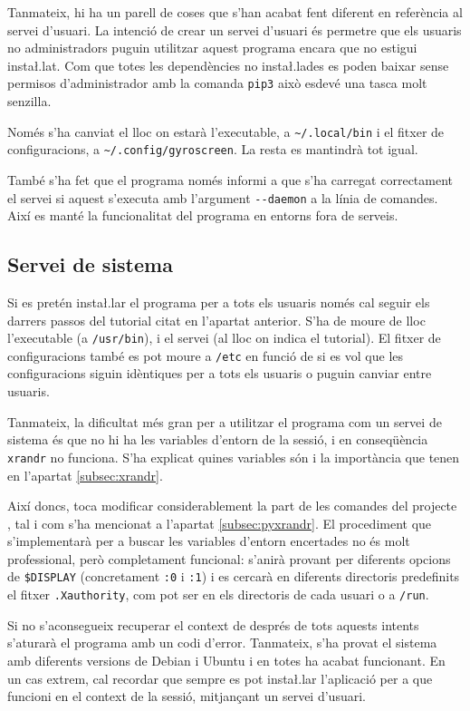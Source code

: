 Tanmateix, hi ha un parell de coses que s'han acabat fent diferent en referència
al servei d'usuari. La intenció de crear un servei d'usuari és permetre que els
usuaris no administradors puguin utilitzar aquest programa encara que no estigui
insta\l.lat. Com que totes les dependències no insta\l.lades es poden baixar
sense permisos d'administrador amb la comanda \verb|pip3| això esdevé una tasca
molt senzilla.

Només s'ha canviat el lloc on estarà l'executable, a \verb|~/.local/bin| i el
fitxer de configuracions, a \verb|~/.config/gyroscreen|. La resta es mantindrà
tot igual.

També s'ha fet que el programa només informi a  que s'ha carregat
correctament el servei si aquest s'executa amb l'argument \verb|--daemon| a la
línia de comandes. Així es manté la funcionalitat del programa en entorns fora
de serveis.

\subsection{Servei de sistema}
\label{subsec:systemd_system}

Si es pretén insta\l.lar el programa per a tots els usuaris només cal seguir
els darrers passos del tutorial citat en l'apartat anterior. S'ha de moure de
lloc l'executable (a \verb|/usr/bin|), i el servei (al lloc on indica el
tutorial). El fitxer de configuracions també es pot moure a \verb|/etc| en funció
de si es vol que les configuracions siguin idèntiques per a tots els usuaris o
puguin canviar entre usuaris.

Tanmateix, la dificultat més gran per a utilitzar el programa com un servei de
sistema és que no hi ha les variables d'entorn de la sessió, i en conseqüència
\verb|xrandr| no funciona. S'ha explicat quines variables són i la importància
que tenen en l'apartat \ref{subsec:xrandr}.

Així doncs, toca modificar considerablement la part de les comandes del
projecte , tal i com s'ha mencionat a l'apartat \ref{subsec:pyxrandr}.
El procediment que s'implementarà per a buscar les variables d'entorn encertades
no és molt professional, però completament funcional: s'anirà provant per diferents
opcions de \verb|$DISPLAY| (concretament \verb|:0| i \verb|:1|) i es cercarà
en diferents directoris predefinits el fitxer \verb|.Xauthority|, com pot ser
en els directoris de cada usuari o a \verb|/run|.

Si no s'aconsegueix recuperar el context de  després de tots aquests
intents s'aturarà el programa amb un codi d'error. Tanmateix, s'ha provat el
sistema amb diferents versions de Debian i Ubuntu i en totes ha acabat funcionant.
En un cas extrem, cal recordar que sempre es pot insta\l.lar l'aplicació per a
que funcioni en el context de la sessió, mitjançant un servei d'usuari.

